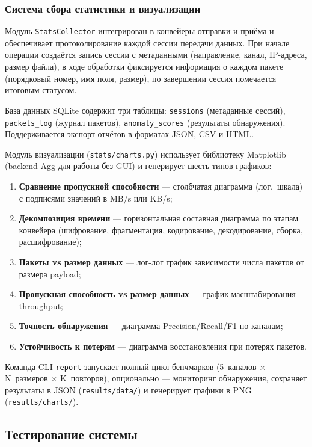 \subsubsection{Система сбора статистики и визуализации}

Модуль \texttt{StatsCollector} интегрирован в конвейеры отправки и приёма и обеспечивает протоколирование каждой сессии передачи данных. При начале операции создаётся запись сессии с метаданными (направление, канал, IP-адреса, размер файла), в ходе обработки фиксируется информация о каждом пакете (порядковый номер, имя поля, размер), по завершении сессия помечается итоговым статусом.

База данных SQLite содержит три таблицы: \texttt{sessions} (метаданные сессий), \texttt{packets\_log} (журнал пакетов), \texttt{anomaly\_scores} (результаты обнаружения). Поддерживается экспорт отчётов в форматах JSON, CSV и HTML.

Модуль визуализации (\texttt{stats/charts.py}) использует библиотеку Matplotlib (backend Agg для работы без GUI) и генерирует шесть типов графиков:

\begin{enumerate}[label=\arabic*)]
    \item \textbf{Сравнение пропускной способности} --- столбчатая диаграмма (лог.~шкала) с подписями значений в MB/s или KB/s;
    \item \textbf{Декомпозиция времени} --- горизонтальная составная диаграмма по этапам конвейера (шифрование, фрагментация, кодирование, декодирование, сборка, расшифрование);
    \item \textbf{Пакеты vs размер данных} --- лог-лог график зависимости числа пакетов от размера payload;
    \item \textbf{Пропускная способность vs размер данных} --- график масштабирования throughput;
    \item \textbf{Точность обнаружения} --- диаграмма Precision/Recall/F1 по каналам;
    \item \textbf{Устойчивость к потерям} --- диаграмма восстановления при потерях пакетов.
\end{enumerate}

Команда CLI \texttt{report} запускает полный цикл бенчмарков (5~каналов $\times$ N~размеров $\times$ K~повторов), опционально --- мониторинг обнаружения, сохраняет результаты в JSON (\texttt{results/data/}) и генерирует графики в PNG (\texttt{results/charts/}).

\subsection{Тестирование системы}

